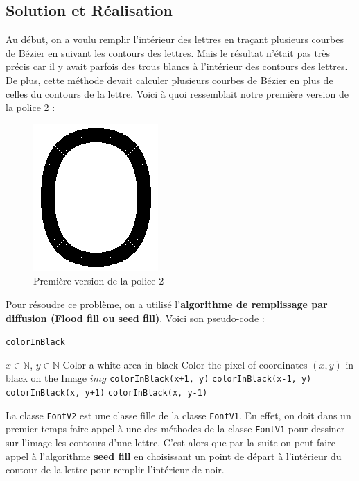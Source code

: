 \documentclass[a4paper, 12pt]{article}
\begin{document}
\subsection{Solution et Réalisation}
Au début, on a voulu remplir l'intérieur des lettres en traçant plusieurs courbes de Bézier en suivant les contours des lettres. Mais le résultat n'était pas très précis car il y avait parfois des trous blancs à l'intérieur des contours des lettres. De plus, cette méthode devait calculer plusieurs courbes de Bézier en plus de celles du contours de la lettre. Voici à quoi ressemblait notre première version de la police 2 : 

\begin{figure}[h]
\centering
\includegraphics[scale=0.9]{Images/FontV2_O_Old.png}
\caption{Première version de la police 2}
\label{fig4}
\end{figure}

	Pour résoudre ce problème, on a utilisé l'\textbf{algorithme de remplissage par diffusion (Flood fill ou seed fill)}. Voici son pseudo-code :
 
\begin{algorithm}
	\caption{\texttt{colorInBlack}}
		\begin{algorithmic}[1]
		\Require $x \in \mathbb{N}$, $y \in \mathbb{N}$
		\Ensure Color a white area in black
			\State \Return
		\EndIf
			\State Color the pixel of coordinates $(x, y)$ in black on the Image $img$
			\State \texttt{colorInBlack(x+1, y)} 
			\State \texttt{colorInBlack(x-1, y)} 
			\State \texttt{colorInBlack(x, y+1)} 
			\State \texttt{colorInBlack(x, y-1)} 
		\EndIf	
		\EndFunction
		\end{algorithmic}
\end{algorithm}
\newpage
La classe \texttt{FontV2} est une classe fille de la classe \texttt{FontV1}. En effet, on doit dans un premier temps faire appel à une des méthodes de la classe \texttt{FontV1} pour dessiner sur l'image les contours d'une lettre. C'est alors que par la suite on peut faire appel à l'algorithme \textbf{seed fill} en choisissant un point de départ à l'intérieur du contour de la lettre pour remplir l'intérieur de noir.\\
\end{document}
